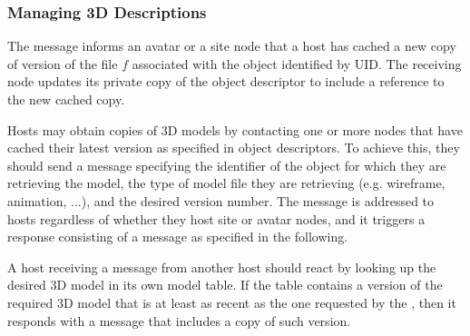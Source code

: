 \subsubsection{Managing 3D Descriptions}


\msgentry{\ncache}
\desc
The \ncache message informs an avatar or a site node that a host has
cached a new copy of \vn version of the file $f$ associated with the
object identified by UID. 
The receiving node updates its private copy of the object descriptor
to include a reference to the new cached copy. 



\msgentry{\modreq}
\desc
Hosts may obtain copies of 3D models by contacting one or more nodes
that have cached their latest version as specified in object
descriptors. To achieve this, they should send a \modreq message
specifying  the identifier of the object for which they are retrieving
the model, the type of model file they are retrieving (e.g. wireframe,
animation, ...), and the desired version number. 
The message is addressed to hosts regardless of whether they host site
or avatar nodes, and it triggers a response consisting of a \modrep
message as specified in the following.


\msgentry{\modrep}
\desc
A host receiving a \modreq message from another host should react by
looking up the desired 3D model in its own model table. If the table
contains a version of the required 3D model that is at least as recent
as the one requested by the \modreq, then it responds with a \modrep
message that includes a copy of such version. 






